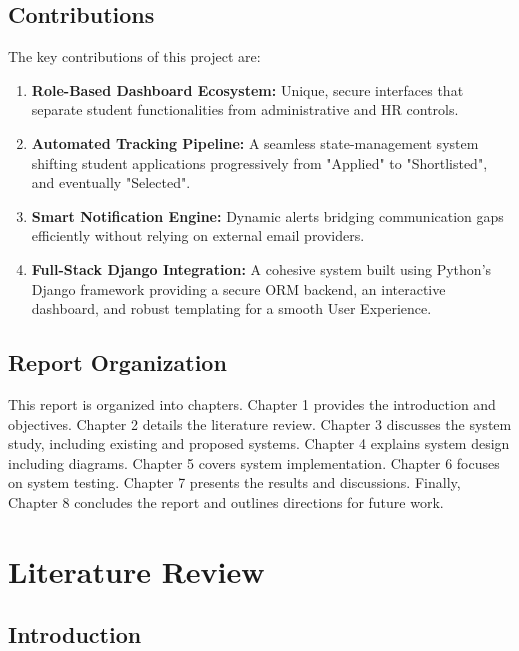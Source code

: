 \documentclass[a4paper,12pt]{report}
\begin{document}
\section{Contributions}

The key contributions of this project are:

\begin{enumerate}
    \item \textbf{Role-Based Dashboard Ecosystem:} Unique, secure interfaces that separate student functionalities from administrative and HR controls.
    \item \textbf{Automated Tracking Pipeline:} A seamless state-management system shifting student applications progressively from "Applied" to "Shortlisted", and eventually "Selected".
    \item \textbf{Smart Notification Engine:} Dynamic alerts bridging communication gaps efficiently without relying on external email providers.
    \item \textbf{Full-Stack Django Integration:} A cohesive system built using Python's Django framework providing a secure ORM backend, an interactive dashboard, and robust templating for a smooth User Experience.
\end{enumerate}

\section{Report Organization}

This report is organized into chapters. Chapter 1 provides the introduction and objectives. Chapter 2 details the literature review. Chapter 3 discusses the system study, including existing and proposed systems. Chapter 4 explains system design including diagrams. Chapter 5 covers system implementation. Chapter 6 focuses on system testing. Chapter 7 presents the results and discussions. Finally, Chapter 8 concludes the report and outlines directions for future work.

\chapter{Literature Review}

\section{Introduction}
\end{document}
